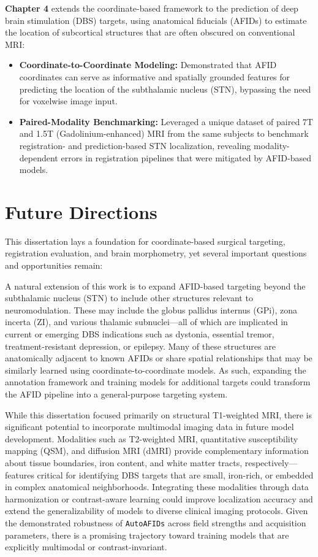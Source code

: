 \textbf{Chapter 4} extends the coordinate-based framework to the prediction of deep brain stimulation (DBS) targets, using anatomical fiducials (AFIDs) to estimate the location of subcortical structures that are often obscured on conventional MRI:
\begin{itemize}
    \item \textbf{Coordinate-to-Coordinate Modeling:} Demonstrated that AFID coordinates can serve as informative and spatially grounded features for predicting the location of the subthalamic nucleus (STN), bypassing the need for voxelwise image input.
    \item \textbf{Paired-Modality Benchmarking:} Leveraged a unique dataset of paired 7T and 1.5T (Gadolinium-enhanced) MRI from the same subjects to benchmark registration- and prediction-based STN localization, revealing modality-dependent errors in registration pipelines that were mitigated by AFID-based models.
\end{itemize}



\section{Future Directions}

This dissertation lays a foundation for coordinate-based surgical targeting, registration evaluation, and brain morphometry, yet several important questions and opportunities remain: 

A natural extension of this work is to expand AFID-based targeting beyond the subthalamic nucleus (STN) to include other structures relevant to neuromodulation. These may include the globus pallidus internus (GPi), zona incerta (ZI), and various thalamic subnuclei—all of which are implicated in current or emerging DBS indications such as dystonia, essential tremor, treatment-resistant depression, or epilepsy. Many of these structures are anatomically adjacent to known AFIDs or share spatial relationships that may be similarly learned using coordinate-to-coordinate models. As such, expanding the annotation framework and training models for additional targets could transform the AFID pipeline into a general-purpose targeting system.

While this dissertation focused primarily on structural T1-weighted MRI, there is significant potential to incorporate multimodal imaging data in future model development. Modalities such as T2-weighted MRI, quantitative susceptibility mapping (QSM), and diffusion MRI (dMRI) provide complementary information about tissue boundaries, iron content, and white matter tracts, respectively—features critical for identifying DBS targets that are small, iron-rich, or embedded in complex anatomical neighborhoods. Integrating these modalities through data harmonization or contrast-aware learning could improve localization accuracy and extend the generalizability of models to diverse clinical imaging protocols. Given the demonstrated robustness of \texttt{AutoAFIDs} across field strengths and acquisition parameters, there is a promising trajectory toward training models that are explicitly multimodal or contrast-invariant.


